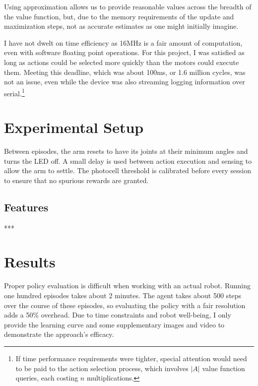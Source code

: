 \documentclass{article}
\begin{document}
	Using approximation allows us to provide reasonable values across the breadth of the value function, but, due to the memory requirements of the update and maximization steps, not as accurate estimates as one might initially imagine.
	
	I have not dwelt on time efficiency as 16MHz is a fair amount of computation, even with software floating point operations. For this project, I was satisfied as long as actions could be selected more quickly than the motors could execute them. Meeting this deadline, which was about 100ms, or 1.6 million cycles, was not an issue, even while the device was also streaming logging information over serial.\footnote{If time performance requirements were tighter, special attention would need to be paid to the action selection process, which involves $|A|$ value function queries, each costing $n$ multiplications.}

	
	
	\section{Experimental Setup}
	
	Between episodes, the arm resets to have its joints at their minimum angles and turns the LED off. A small delay is used between action execution and sensing to allow the arm to settle. The photocell threshold is calibrated before every session to ensure that no spurious rewards are granted.
	
	\subsection{Features}

	***
	
	
	
	\section{Results}

	Proper policy evaluation is difficult when working with an actual robot. Running one hundred episodes takes about 2 minutes. The agent takes about 500 steps over the course of these episodes, so evaluating the policy with a fair resolution adds a 50\% overhead. Due to time constraints and robot well-being, I only provide the learning curve and some supplementary images and video to demonstrate the approach's efficacy.
	
\end{document}
